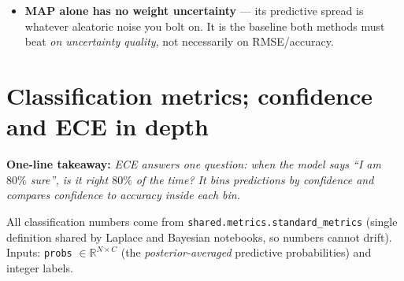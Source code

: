 \documentclass[10pt,a4paper]{article}
\newcommand{\code}[1]{\texttt{#1}}
\newcommand{\takeaway}[1]{\textbf{One-line takeaway:} \emph{#1}}
\begin{document}
\begin{itemize}
  precision $\delta$ and weight decay $\lambda$ are interchangeable currencies.
  \emph{Bookkeeping detail used in the notebooks:} optimizers apply weight decay to the
  \emph{mean} batch loss, so the equivalent prior precision on the \emph{sum} log-likelihood scale
  is $\delta=\lambda\cdot S$ where $S$ is whatever the loss normalizes by ($N$ or batch size) ---
  this is exactly why the notebooks set \code{prior\_precision = WEIGHT\_DECAY * N} (PovertyMap) or
  \code{* batch\_size} (Two Moons BNN).
\item \textbf{MAP alone has no weight uncertainty} --- its predictive spread is whatever aleatoric
  noise you bolt on. It is the baseline both methods must beat \emph{on uncertainty quality}, not
  necessarily on RMSE/accuracy.
\end{itemize}

\section{Classification metrics; confidence and ECE in depth}\label{sec:ece}
\takeaway{ECE answers one question: when the model says ``I am $80\%$ sure'', is it right $80\%$ of
the time? It bins predictions by confidence and compares confidence to accuracy inside each bin.}

All classification numbers come from \code{shared.metrics.standard\_metrics} (single definition
shared by Laplace and Bayesian notebooks, so numbers cannot drift). Inputs: \code{probs}
$\in\mathbb{R}^{N\times C}$ (the \emph{posterior-averaged} predictive probabilities) and integer
labels.
\end{document}
